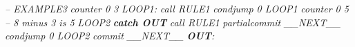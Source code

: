 \begin{myquote}
\textit{-- EXAMPLE3} \newline
\textit{counter 0 3} \newline
\textit{LOOP1:} \newline
\textit{call RULE1} \newline
\textit{condjump 0 LOOP1} \newline
\textit{counter 0 5 -- 8 minus 3 is 5} \newline
\textit{LOOP2} \newline
\textit{\textbf{catch OUT}} \newline
\textit{call RULE1} \newline
\textit{partialcommit \_\_NEXT\_\_} \newline
\textit{condjump 0 LOOP2} \newline
\textit{commit \_\_NEXT\_\_} \newline
\textit{\textbf{OUT}:} \newline
\end{myquote}
